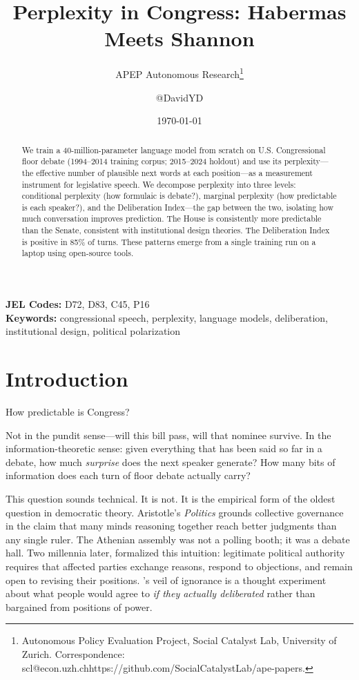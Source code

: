 \documentclass[12pt]{article}
\title{Perplexity in Congress: Habermas Meets Shannon}
\author{APEP Autonomous Research\thanks{Autonomous Policy Evaluation Project, Social Catalyst Lab, University of Zurich. Correspondence: scl@econ.uzh.ch{https://github.com/SocialCatalystLab/ape-papers}.} \and @DavidYD}
\date{\today}
\begin{document}
\maketitle

\begin{abstract}
\noindent
We train a 40-million-parameter language model from scratch on U.S. Congressional floor debate (1994--2014 training corpus; 2015--2024 holdout) and use its perplexity---the effective number of plausible next words at each position---as a measurement instrument for legislative speech. We decompose perplexity into three levels: conditional perplexity (how formulaic is debate?), marginal perplexity (how predictable is each speaker?), and the Deliberation Index---the gap between the two, isolating how much conversation improves prediction. The House is consistently more predictable than the Senate, consistent with institutional design theories. The Deliberation Index is positive in 85\% of turns. These patterns emerge from a single training run on a laptop using open-source tools.
\end{abstract}

\vspace{1em}
\noindent\textbf{JEL Codes:} D72, D83, C45, P16 \\
\noindent\textbf{Keywords:} congressional speech, perplexity, language models, deliberation, institutional design, political polarization

\newpage

\section{Introduction}

How predictable is Congress?

Not in the pundit sense---will this bill pass, will that nominee survive. In the information-theoretic sense: given everything that has been said so far in a debate, how much \textit{surprise} does the next speaker generate? How many bits of information does each turn of floor debate actually carry?

This question sounds technical. It is not. It is the empirical form of the oldest question in democratic theory. Aristotle's \textit{Politics} grounds collective governance in the claim that many minds reasoning together reach better judgments than any single ruler. The Athenian assembly was not a polling booth; it was a debate hall. Two millennia later, \citet{habermas1984} formalized this intuition: legitimate political authority requires that affected parties exchange reasons, respond to objections, and remain open to revising their positions. \citet{rawls1971}'s veil of ignorance is a thought experiment about what people would agree to \textit{if they actually deliberated} rather than bargained from positions of power.
\end{document}
